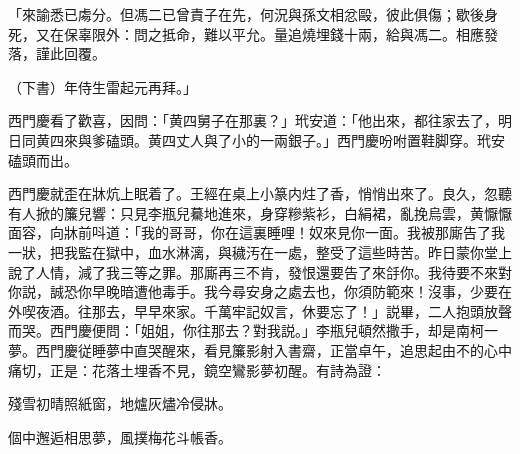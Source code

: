 「來諭悉已䖏分。但馮二已曾責子在先，何況與孫文相忿毆，彼此俱傷；歇後身死，又在保辜限外：問之抵命，難以平允。量追燒埋錢十兩，給與馮二。相應發落，謹此回覆。

（下書）年侍生雷起元再拜。」

西門慶看了歡喜，因問：「黄四舅子在那裏？」玳安道：「他出來，都往家去了，明日同黄四來與爹磕頭。黄四丈人與了小的一兩銀子。」西門慶吩咐置鞋脚穿。玳安磕頭而出。

西門慶就歪在牀炕上眠着了。王經在桌上小篆内炷了香，悄悄出來了。良久，忽聽有人掀的簾兒響：只見李瓶兒驀地進來，身穿糝紫衫，白絹裙，亂挽烏雲，黄懨懨面容，向牀前呌道：「我的哥哥，你在這裏睡哩！奴來見你一面。我被那廝告了我一狀，把我監在獄中，血水淋漓，與穢汚在一處，整受了這些時苦。昨日蒙你堂上說了人情，減了我三等之罪。那廝再三不肯，發恨還要告了來㧱你。我待要不來對你説，誠恐你早晚暗遭他毒手。我今尋安身之處去也，你須防範來！沒事，少要在外喫夜酒。往那去，早早來家。千萬牢記奴言，休要忘了！」説畢，二人抱頭放聲而哭。西門慶便問：「姐姐，你往那去？對我説。」李瓶兒頓然撒手，却是南柯一夢。西門慶従睡夢中直哭醒來，看見簾影射入書齋，正當卓午，追思起由不的心中痛切，正是：花落土埋香不見，鏡空鸞影夢初醒。有詩為證：

殘雪初晴照紙窗，地爐灰燼冷侵牀。

個中邂逅相思夢，風撲梅花斗帳香。

